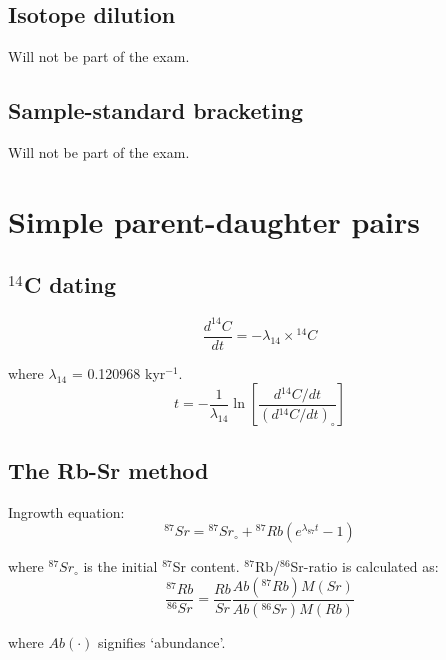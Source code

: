 \documentclass{article}
\begin{document}
\begin{multicols}{3}
\subsection{Isotope dilution}
\label{sec:isotope-dilution}

Will not be part of the exam.

\subsection{Sample-standard bracketing}
\label{sec:bracketing}

Will not be part of the exam.

\section{Simple parent-daughter pairs}
\label{ch:intro2PD}

\subsection{$^{14}$C dating}
\label{sec:14C}

\begin{equation}
\frac{d^{14}C}{dt} = -\lambda_{14} \times {}^{14}C
\label{eq:d14Cdt}
\end{equation}

where $\lambda_{14}$ = 0.120968 kyr$^{-1}$.
\begin{equation}
t = -\frac{1}{\lambda_{14}}
\ln\left[\frac{d{}^{14}C/dt}{(d{}^{14}C/dt)_\circ}\right]
\label{eq:t14C}
\end{equation}

\subsection{The Rb-Sr method}
\label{sec:Rb-Sr}

Ingrowth equation:
\begin{equation}
{}^{87}Sr = {}^{87}Sr_\circ + {}^{87}Rb (e^{\lambda_{87} t} - 1)
\label{eq:87Sr*}
\end{equation}

where $^{87}Sr_\circ$ is the initial $^{87}$Sr content.
$^{87}$Rb/$^{86}$Sr-ratio is calculated as:
\begin{equation}
\frac{^{87}Rb}{^{86}Sr} =
\frac{Rb}{Sr} \frac{Ab(^{87}Rb)
  M(Sr)}{Ab(^{86}Sr) M(Rb)}
\label{eq:87Rb86Sr}
\end{equation}

where $Ab(\cdot)$ signifies `abundance'.


\end{multicols}
\end{document}
